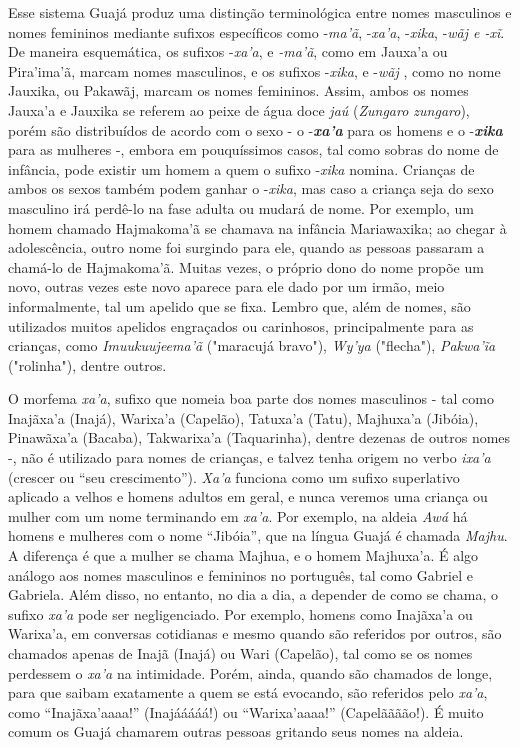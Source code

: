 Esse sistema Guajá produz uma distinção terminológica entre nomes
masculinos e nomes femininos mediante sufixos específicos como
-\emph{ma'ã}, -\emph{xa'a}, -\emph{xika}, -\emph{wãj e -xĩ}. De maneira
esquemática, os sufixos -\emph{xa'a}, e \emph{-ma'ã}, como em Jauxa'a ou
Pira'ima'ã, marcam nomes masculinos, e os sufixos -\emph{xika}, e
-\emph{wãj} , como no nome Jauxika, ou Pakawãj, marcam os nomes
femininos. Assim, ambos os nomes Jauxa'a e Jauxika se referem ao peixe
de água doce \emph{jaú} (\emph{Zungaro zungaro}), porém são distribuídos
de acordo com o sexo - o -\emph{\textbf{xa'a}} para os homens e o
-\emph{\textbf{xika}} para as mulheres -, embora em pouquíssimos casos,
tal como sobras do nome de infância, pode existir um homem a quem o
sufixo -\emph{xika} nomina. Crianças de ambos os sexos também podem
ganhar o -\emph{xika}, mas caso a criança seja do sexo masculino irá
perdê-lo na fase adulta ou mudará de nome. Por exemplo, um homem chamado
Hajmakoma'ã se chamava na infância Mariawaxika; ao chegar à
adolescência, outro nome foi surgindo para ele, quando as pessoas
passaram a chamá-lo de Hajmakoma'ã. Muitas vezes, o próprio dono do nome
propõe um novo, outras vezes este novo aparece para ele dado por um
irmão, meio informalmente, tal um apelido que se fixa. Lembro que, além
de nomes, são utilizados muitos apelidos engraçados ou carinhosos,
principalmente para as crianças, como \emph{Imuukuujeema'ã} ("maracujá
bravo"), \emph{Wy'ya} ("flecha"), \emph{Pakwa'ĩa} ("rolinha"), dentre
outros.

O morfema \emph{xa'a}, sufixo que nomeia boa parte dos nomes masculinos
- tal como Inajãxa'a (Inajá), Warixa'a (Capelão), Tatuxa'a (Tatu),
Majhuxa'a (Jibóia), Pinawãxa'a (Bacaba), Takwarixa'a (Taquarinha),
dentre dezenas de outros nomes -, não é utilizado para nomes de
crianças, e talvez tenha origem no verbo \emph{ixa'a} (crescer ou ``seu
crescimento''). \emph{Xa'a} funciona como um sufixo superlativo aplicado
a velhos e homens adultos em geral, e nunca veremos uma criança ou
mulher com um nome terminando em \emph{xa'a}. Por exemplo, na aldeia
\emph{Awá} há homens e mulheres com o nome ``Jibóia'', que na língua
Guajá é chamada \emph{Majhu}. A diferença é que a mulher se chama
Majhua, e o homem Majhuxa'a. É algo análogo aos nomes masculinos e
femininos no português, tal como Gabriel e Gabriela. Além disso, no
entanto, no dia a dia, a depender de como se chama, o sufixo \emph{xa'a}
pode ser negligenciado. Por exemplo, homens como Inajãxa'a ou Warixa'a,
em conversas cotidianas e mesmo quando são referidos por outros, são
chamados apenas de Inajã (Inajá) ou Wari (Capelão), tal como se os nomes
perdessem o \emph{xa'a} na intimidade. Porém, ainda, quando são chamados
de longe, para que saibam exatamente a quem se está evocando, são
referidos pelo \emph{xa'a}, como ``Inajãxa'aaaa!'' (Inajááááá!) ou
``Warixa'aaaa!'' (Capelãããão!). É muito comum os Guajá chamarem outras
pessoas gritando seus nomes na aldeia.

